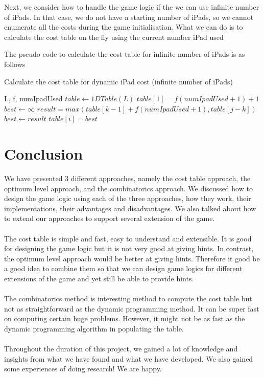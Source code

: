 \documentclass[12pt,a4paper,oneside]{report}
\begin{document}
Next, we consider how to handle the game logic if the we can use infinite number of iPads. In that case, we do not have a starting number of iPads, so we cannot enumerate all the costs during the game initialisation. What we can do is to calculate the cost table on the fly using the current number iPad used 

The pseudo code to calculate the cost table for infinite number of iPads is as follows

\begin{algorithm}[H]
\caption{Calculate the cost table for dynamic iPad cost (infinite number of iPads)}
\begin{algorithmic}[1]
\REQUIRE L, f, numIpadUsed
\STATE $table \leftarrow 1DTable(L)$
\STATE $table[1] = f(numIpadUsed+1)+1$
	\STATE $best \leftarrow \infty$
		\STATE $result = max(table[k - 1] + f(numIpadUsed+1), table[j - k])$
			\STATE $best \leftarrow result$
		\ENDIF
	\ENDFOR
	\STATE $table[i] = best$
\ENDFOR
\end{algorithmic}
\end{algorithm}


\chapter{Conclusion}
We have presented 3 different approaches, namely the cost table approach, the optimum level approach, and the combinatorics approach. We discussed how to design the game logic using each of the three approaches, how they work, their implementations, their advantages and disadvantages. We also talked about how to extend our approaches to support several extension of the game. \\\\
The cost table is simple and fast, easy to understand and extensible. It is good for designing the game logic but it is not very good at giving hints. In contrast, the optimum level approach would be better at giving hints. Therefore it good be a good idea to combine them so that we can design game logics for different extensions of the game and yet still be able to provide hints. \\\\
The combinatorics method is interesting method to compute the cost table but not as straightforward as the dynamic programming method. It can be super fast on computing certain huge problems. However, it might not be as fast as the dynamic programming algorithm in populating the table. \\\\
Throughout the duration of this project, we gained a lot of knowledge and insights from what we have found and what we have developed. We also gained some experiences of doing research! We are happy.
\end{document}
